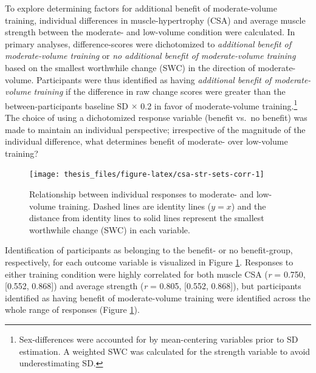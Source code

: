 \documentclass[twoside,10pt]{gihclass} %
\begin{document}
To explore determining factors for additional benefit of moderate-volume training, individual differences in muscle-hypertrophy (CSA) and average muscle strength between the moderate- and low-volume condition were calculated. In primary analyses, difference-scores were dichotomized to \emph{additional benefit of moderate-volume training} or \emph{no additional benefit of moderate-volume training} based on the smallest worthwhile change (SWC) in the direction of moderate-volume. Participants were thus identified as having \emph{additional benefit of moderate-volume training} if the difference in raw change scores were greater than the between-participants baseline SD \(\times\) 0.2 in favor of moderate-volume training.\footnote{Sex-differences were accounted for by mean-centering variables prior to SD estimation. A weighted SWC was calculated for the strength variable to avoid underestimating SD.}
The choice of using a dichotomized response variable (benefit vs.~no benefit) was made to maintain an individual perspective; irrespective of the magnitude of the individual difference, what determines benefit of moderate- over low-volume training?
\begin{figure}

{\centering \texttt{[image: thesis\_files/figure-latex/csa-str-sets-corr-1]} 

}

\caption[]{Relationship between individual responses to moderate- and low-volume training. Dashed lines are identity lines ($y = x$) and the distance from identity lines to solid lines represent the smallest worthwhile change (SWC) in each variable.}\label{fig:csa-str-sets-corr}
\end{figure}
Identification of participants as belonging to the benefit- or no benefit-group, respectively, for each outcome variable is visualized in Figure \ref{fig:csa-str-sets-corr}. Responses to either training condition were highly correlated for both muscle CSA (\emph{r} = 0.750, {[}0.552, 0.868{]}) and average strength (\emph{r} = 0.805, {[}0.552, 0.868{]}), but participants identified as having benefit of moderate-volume training were identified across the whole range of responses (Figure \ref{fig:csa-str-sets-corr}).
\end{document}
